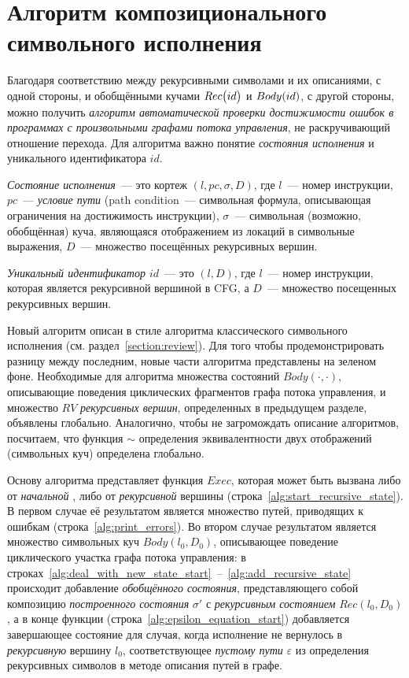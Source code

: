 \section{Алгоритм композиционального символьного исполнения}

Благодаря соответствию между рекурсивными символами и их описаниями, с одной стороны, и обобщёнными кучами $Rec\big(id\big)$ и $Body{}(id)$, с другой стороны, можно 
получить \emph{алгоритм автоматической проверки достижимости ошибок в программах с произвольными графами потока управления}, не раскручивающий отношение перехода. Для алгоритма важно понятие \emph{состояния исполнения} и уникального идентификатора $id$.

\begin{defn}
\emph{Состояние исполнения}~--- это кортеж $(l,pc,\sigma,D)$, где $l$~--- номер инструкции,
$pc$~--- \emph{условие пути} (path condition~--- символьная формула, описывающая ограничения на достижимость инструкции), $\sigma$~--- символьная (возможно, обобщённая) куча, являющаяся отображением из локаций в символьные выражения, $D$~--- множество посещённых рекурсивных вершин.

\emph{Уникальный идентификатор $id$}~--- это $(l,D)$, где $l$~--- номер инструкции, которая является рекурсивной вершиной в CFG, а $D$~--- множество посещенных рекурсивных вершин.
\end{defn}

Новый алгоритм описан в стиле алгоритма классического символьного исполнения (см. раздел~\ref{section:review}). Для того чтобы продемонстрировать разницу между последним, новые части алгоритма представлены на зеленом фоне. Необходимые для алгоритма множества состояний $Body(\cdot,\cdot)$, описывающие поведения циклических фрагментов графа потока управления, и множество $RV$ \emph{рекурсивных вершин}, определенных в предыдущем разделе, объявлены глобально. Аналогично, чтобы не загромождать описание алгоритмов, посчитаем, что функция $\sim$ определения эквивалентности двух отображений (символьных куч) определена глобально.

Основу алгоритма представляет функция $Exec$, которая может быть вызвана либо от \emph{начальной} , 
либо от \emph{рекурсивной} вершины (строка~\ref{alg:start_recursive_state}). В первом случае её результатом является  множество путей, приводящих к ошибкам (строка~\ref{alg:print_errors}).
Во втором случае результатом является множество символьных куч $Body(l_0,D_0)$, описывающее поведение циклического участка графа потока управления:
в строках~\ref{alg:deal_with_new_state_start}~--~\ref{alg:add_recursive_state} 
происходит добавление \emph{обобщённого состояния}, представляющего собой композицию \emph{построенного состояния} $\sigma'$ с \emph{рекурсивным состоянием} $Rec(l_0,D_0)$, 
а в конце функции (строка~\ref{alg:epsilon_equation_start}) добавляется завершающее состояние для случая, 
когда исполнение не вернулось в \emph{рекурсивную} вершину $l_0$,
соответствующее \emph{пустому пути} $\varepsilon$ из определения рекурсивных символов в методе описания путей в графе.



